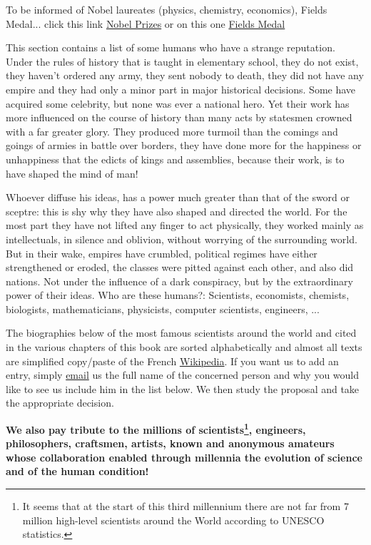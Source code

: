 To be informed of Nobel laureates (physics, chemistry, economics), Fields Medal... click this link {\href{http://www.nobelprize.org/}{{\color{blue}Nobel Prizes}}} or on this one {\href{http://www.fields.utoronto.ca/aboutus/jcfields/fields_medal.html}{{\color{blue}Fields Medal}}}

This section contains a list of some humans who have a strange reputation. Under the rules of history that is taught in elementary school, they do not exist, they haven't ordered any army, they sent nobody to death, they did not have any empire and they had only a minor part in major historical decisions. Some have acquired some celebrity, but none was ever a national hero. Yet their work has more influenced on the course of history than many acts by statesmen crowned with a far greater glory. They produced more turmoil than the comings and goings of armies in battle over borders, they have done more for the happiness or unhappiness that the edicts of kings and assemblies, because their work, is to have shaped the mind of man!

Whoever diffuse his ideas, has a power much greater than that of the sword or sceptre: this is shy why they have also shaped and directed the world. For the most part they have not lifted any finger to act physically, they worked mainly as intellectuals, in silence and oblivion, without worrying of the surrounding world. But in their wake, empires have crumbled, political regimes have either strengthened or eroded, the classes were pitted against each other, and also did nations. Not under the influence of a dark conspiracy, but by the extraordinary power of their ideas. Who are these humans?: Scientists, economists, chemists, biologists, mathematicians, physicists, computer scientists, engineers, ...

The biographies below of the most famous scientists around the world and cited in the various chapters of this book are sorted alphabetically and almost all texts are simplified copy/paste of the French {\href{http://www.wikipedia.fr}{{\color{blue}Wikipedia}}}. If you want us to add an entry, simply  {\href{mailto:isoz@sciences.ch}{{\color{blue}email}}} us the full name of the concerned person and why you would like to see us include him in the list below. We then study the proposal and take the appropriate decision.

\textbf{We also pay tribute to the millions of scientists\footnote{It seems that at the start of this third millennium there are not far from 7 million high-level scientists around the World according to UNESCO statistics.}, engineers, philosophers, craftsmen, artists, known and anonymous amateurs whose collaboration enabled through millennia the evolution of science and of the human condition!}

